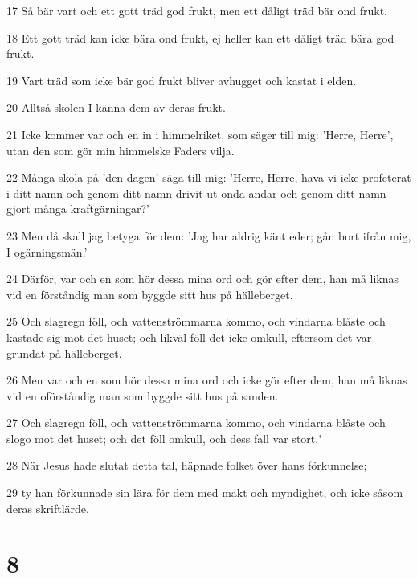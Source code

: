 \par 17 Så bär vart och ett gott träd god frukt, men ett dåligt träd bär ond frukt.
\par 18 Ett gott träd kan icke bära ond frukt, ej heller kan ett dåligt träd bära god frukt.
\par 19 Vart träd som icke bär god frukt bliver avhugget och kastat i elden.
\par 20 Alltså skolen I känna dem av deras frukt. -
\par 21 Icke kommer var och en in i himmelriket, som säger till mig: 'Herre, Herre', utan den som gör min himmelske Faders vilja.
\par 22 Många skola på 'den dagen' säga till mig: 'Herre, Herre, hava vi icke profeterat i ditt namn och genom ditt namn drivit ut onda andar och genom ditt namn gjort många kraftgärningar?'
\par 23 Men då skall jag betyga för dem: 'Jag har aldrig känt eder; gån bort ifrån mig, I ogärningsmän.'
\par 24 Därför, var och en som hör dessa mina ord och gör efter dem, han må liknas vid en förståndig man som byggde sitt hus på hälleberget.
\par 25 Och slagregn föll, och vattenströmmarna kommo, och vindarna blåste och kastade sig mot det huset; och likväl föll det icke omkull, eftersom det var grundat på hälleberget.
\par 26 Men var och en som hör dessa mina ord och icke gör efter dem, han må liknas vid en oförståndig man som byggde sitt hus på sanden.
\par 27 Och slagregn föll, och vattenströmmarna kommo, och vindarna blåste och slogo mot det huset; och det föll omkull, och dess fall var stort."
\par 28 När Jesus hade slutat detta tal, häpnade folket över hans förkunnelse;
\par 29 ty han förkunnade sin lära för dem med makt och myndighet, och icke såsom deras skriftlärde.

\chapter{8}

